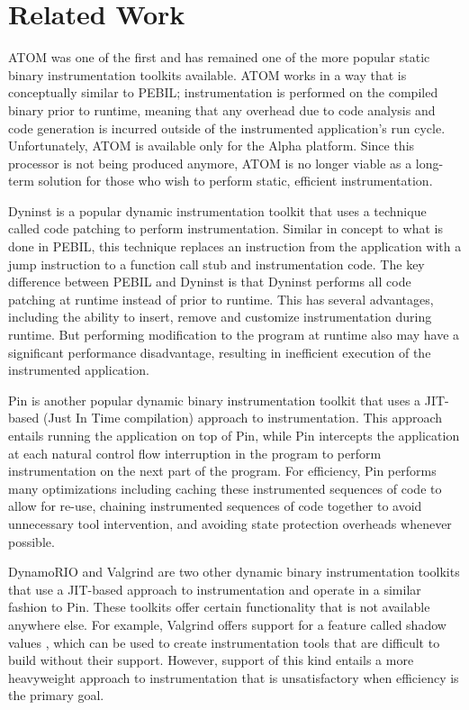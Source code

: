 \section{Related Work}
\label{sec:Related}

ATOM \cite{srivastava1994atom} was one of the first and has remained one of the
more popular static binary instrumentation toolkits available. ATOM works in a
way that is conceptually similar to PEBIL; instrumentation is performed on the
compiled binary prior to runtime, meaning that any overhead due to code analysis
and code generation is incurred outside of the instrumented application's run
cycle. Unfortunately, ATOM is available only for the Alpha platform. Since this
processor is not being produced anymore, ATOM is no longer viable as a long-term
solution for those who wish to perform static, efficient instrumentation. 

Dyninst \cite{buck2000api} is a popular dynamic instrumentation toolkit that
uses a technique called code patching to perform instrumentation. Similar in
concept to what is done in PEBIL, this technique replaces an instruction from
the application with a jump instruction to a function call stub and
instrumentation code. The key difference between PEBIL and Dyninst is that
Dyninst performs all code patching at runtime instead of prior to runtime. This
has several advantages, including the ability to insert, remove and customize
instrumentation during runtime. But performing modification to the program at
runtime also may have a significant performance disadvantage, resulting in
inefficient execution of the instrumented application.

Pin \cite{luk2005pin} is another popular dynamic binary instrumentation toolkit
that uses a JIT-based (Just In Time compilation) approach to instrumentation.
This approach entails running the application on top of Pin, while Pin
intercepts the application at each natural control flow interruption in the
program to perform instrumentation on the next part of the program. For
efficiency, Pin performs many optimizations including caching these instrumented
sequences of code to allow for re-use, chaining instrumented sequences of code
together to avoid unnecessary tool intervention, and avoiding state protection
overheads whenever possible.

DynamoRIO \cite{bruening2004efficient} and Valgrind
\cite{nethercote2007valgrind} are two other dynamic binary instrumentation
toolkits that use a JIT-based approach to instrumentation and operate in a
similar fashion to Pin. These toolkits offer certain functionality that is not
available anywhere else. For example, Valgrind offers support for a feature
called shadow values \cite{nethercote2007shadow}, which can be used to create
instrumentation tools that are difficult to build without their
support. However, support of this kind entails a more heavyweight approach to
instrumentation that is unsatisfactory when efficiency is the primary goal.
